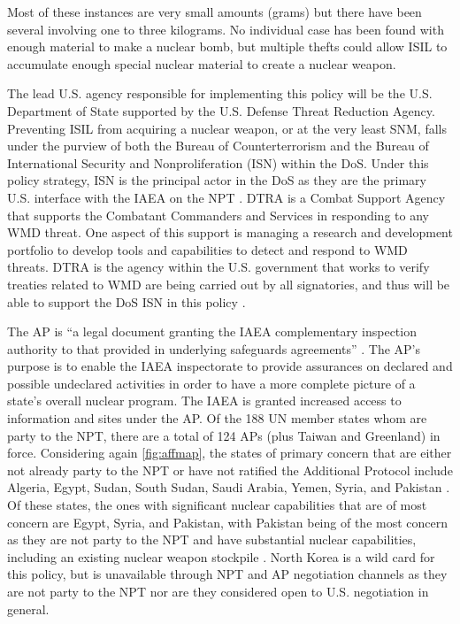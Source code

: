 \documentclass{report}
\begin{document}
Most of these instances are very small amounts (grams) but there have been several involving one to three kilograms. No individual case has been found with enough material to make a nuclear bomb, but multiple thefts could allow ISIL to accumulate enough special nuclear material to create a nuclear weapon. 


The lead U.S. agency responsible for implementing this policy will be the U.S. Department of State  supported by the U.S. Defense Threat Reduction Agency. Preventing ISIL from acquiring a nuclear weapon, or at the very least SNM, falls under the purview of both the Bureau of Counterterrorism and the Bureau of International Security and Nonproliferation (ISN) within the DoS. Under this policy strategy, ISN is the principal actor in the DoS as they are the primary U.S. interface with the IAEA on the NPT \cite{Circular1970}. DTRA is a Combat Support Agency that supports the Combatant Commanders and Services in responding to any WMD threat. One aspect of this support is managing a research and development portfolio to develop tools and capabilities to detect and respond to WMD threats. DTRA is the agency within the U.S. government that works to verify treaties related to WMD are being carried out by all signatories, and thus will be able to support the DoS ISN in this policy \cite{DefenseThreatReductionAgency}. 

The AP is \enquote{a legal document granting the IAEA complementary inspection authority to that provided in underlying safeguards agreements} \cite{InternationalAtomicEnergyAgency1997}. The AP's purpose is to enable the IAEA inspectorate to provide assurances on declared and possible undeclared activities in order to have a more complete picture of a state's overall nuclear program. The IAEA is granted increased access to information and sites under the AP. Of the 188 UN member states whom are party to the NPT, there are a total of 124 APs (plus Taiwan and Greenland) in force. Considering again \autoref{fig:affmap}, the states of primary concern that are either not already party to the NPT or have not ratified the Additional Protocol include Algeria, Egypt, Sudan, South Sudan, Saudi Arabia, Yemen, Syria, and Pakistan \cite{DefenseThreatReductionAgency,InventoryofInternationalNonproliferationOrganizationsandRegimes2013}. Of these states, the ones with significant nuclear capabilities that are of most concern are Egypt, Syria, and Pakistan, with Pakistan being of the most concern as they are not party to the NPT and have substantial nuclear capabilities, including an existing nuclear weapon stockpile \cite{InventoryofInternationalNonproliferationOrganizationsandRegimes2013}. North Korea is a wild card for this policy, but is unavailable through NPT and AP negotiation channels as they are not party to the NPT nor are they considered open to U.S. negotiation in general. 
\end{document}
